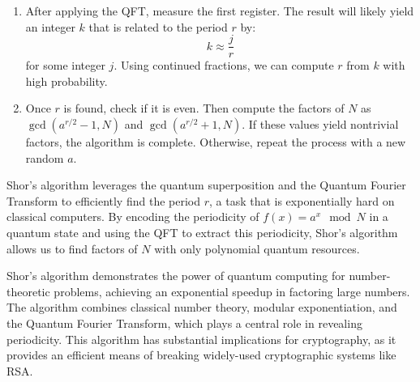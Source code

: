 \documentclass{article}
\begin{document}
\begin{enumerate}
				In Shor’s algorithm, the QFT allows us to move from a superposition over the computational basis to one where the periodicity of \( f(x) = a^x \mod N \) becomes measurable.

				The QFT circuit consists of Hadamard gates and controlled phase rotations, with the following steps for an \( n \)-qubit register:
				
				\begin{enumerate}
					\item Apply a Hadamard gate to the first qubit.
					\item Apply controlled phase rotations between each qubit, such that each subsequent qubit has a phase shift based on the values of the previous qubits.
					\item Repeat this process for each qubit, applying decreasing rotations as the circuit progresses.
					\item Finally, perform a "swap" operation to reverse the order of the qubits.
				\end{enumerate}

				The QFT transforms the state so that measuring it will reveal information about the period \( r \) in the frequency domain.

			\item After applying the QFT, measure the first register. The result will likely yield an integer \( k \) that is related to the period \( r \) by:
				\[
				k \approx \frac{j}{r}
				\]
				for some integer \( j \). Using continued fractions, we can compute \( r \) from \( k \) with high probability.

			\item Once \( r \) is found, check if it is even. Then compute the factors of \( N \) as \( \gcd(a^{r/2} - 1, N) \) and \( \gcd(a^{r/2} + 1, N) \). If these values yield nontrivial factors, the algorithm is complete. Otherwise, repeat the process with a new random \( a \).
		\end{enumerate}

		Shor's algorithm leverages the quantum superposition and the Quantum Fourier Transform to efficiently find the period \( r \), a task that is exponentially hard on classical computers. By encoding the periodicity of \( f(x) = a^x \mod N \) in a quantum state and using the QFT to extract this periodicity, Shor's algorithm allows us to find factors of \( N \) with only polynomial quantum resources.

		Shor's algorithm demonstrates the power of quantum computing for number-theoretic problems, achieving an exponential speedup in factoring large numbers. The algorithm combines classical number theory, modular exponentiation, and the Quantum Fourier Transform, which plays a central role in revealing periodicity. This algorithm has substantial implications for cryptography, as it provides an efficient means of breaking widely-used cryptographic systems like RSA.
\end{document}
